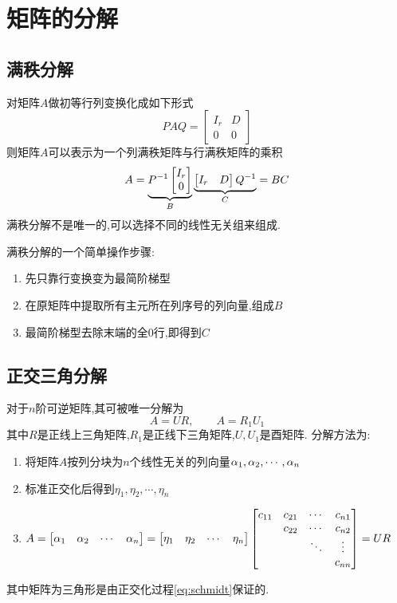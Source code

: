 \documentclass{matrix-review}
\begin{document}
\section{矩阵的分解}

\subsection{满秩分解}
对矩阵$A$做初等行列变换化成如下形式\begin{equation*}
    PAQ=\begin{bmatrix}
        I_r & D \\ 0 & 0
    \end{bmatrix}
\end{equation*}则矩阵$A$可以表示为一个列满秩矩阵与行满秩矩阵的乘积\begin{equation}
    A=\underbrace{P^{-1}\begin{bmatrix}I_r \\ 0\end{bmatrix}}_B \underbrace{\begin{bmatrix}I_r & D\end{bmatrix}Q^{-1}}_C = BC
\end{equation}满秩分解不是唯一的,可以选择不同的线性无关组来组成.
\begin{remarkbox}
    满秩分解的一个简单操作步骤:
    \begin{enumerate}
        \item 先只靠行变换变为最简阶梯型
        \item 在原矩阵中提取所有主元所在列序号的列向量,组成$B$
        \item 最简阶梯型去除末端的全0行,即得到$C$
    \end{enumerate}
\end{remarkbox}

\subsection{正交三角分解}
对于$n$阶可逆矩阵,其可被唯一分解为$$A=UR,\qquad A=R_1U_1$$其中$R$是正线上三角矩阵,$R_1$是正线下三角矩阵,$U,U_1$是酉矩阵.
分解方法为:
\begin{enumerate}
    \item 将矩阵$A$按列分块为$n$个线性无关的列向量${\alpha_1,\alpha_2,\cdots,\alpha_n}$
    \item 标准正交化后得到${\eta_1,\eta_2,\cdots,\eta_n}$
    \item $A=\begin{bmatrix}\alpha_1& \alpha_2& \cdots& \alpha_n\end{bmatrix}=\begin{bmatrix}\eta_1& \eta_2& \cdots& \eta_n\end{bmatrix}
              \begin{bmatrix}
                  c_{11} & c_{21} & \cdots & c_{n1} \\
                         & c_{22} & \cdots & c_{n2} \\
                         &        & \ddots & \vdots \\
                         &        &        & c_{nn}
              \end{bmatrix}=UR$
\end{enumerate}
\begin{remarkbox}
    其中矩阵为三角形是由正交化过程\eqref{eq:schmidt}保证的.
\end{remarkbox}
\end{document}
